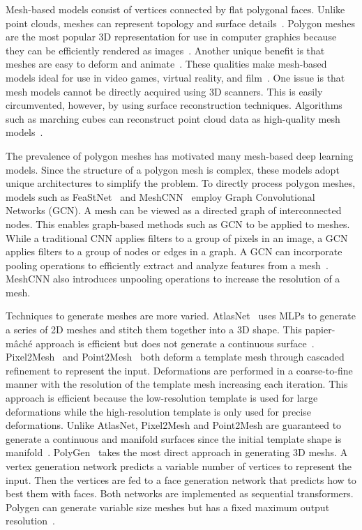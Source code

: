 Mesh-based models consist of vertices connected by flat polygonal faces. Unlike point clouds, meshes can represent topology and surface details~\cite{Xiao2020}. Polygon meshes are the most popular 3D representation for use in computer graphics because they can be efficiently rendered as images~\cite{Watt1996}. Another unique benefit is that meshes are easy to deform and animate~\cite{Wang2018}. These qualities make mesh-based models ideal for use in video games, virtual reality, and film~\cite{Nash2020}. One issue is that mesh models cannot be directly acquired using 3D scanners. This is easily circumvented, however, by using surface reconstruction techniques. Algorithms such as marching cubes can reconstruct point cloud data as high-quality mesh models~\cite{Yuan2022}.

The prevalence of polygon meshes has motivated many mesh-based deep learning models. Since the structure of a polygon mesh is complex, these models adopt unique architectures to simplify the problem. To directly process polygon meshes, models such as FeaStNet~\cite{Verma2018} and MeshCNN~\cite{Hanocka2019} employ Graph Convolutional Networks (GCN). A mesh can be viewed as a directed graph of interconnected nodes. This enables graph-based methods such as GCN to be applied to meshes. While a traditional CNN applies filters to a group of pixels in an image, a GCN applies filters to a group of nodes or edges in a graph. A GCN can incorporate pooling operations to efficiently extract and analyze features from a mesh~\cite{Verma2018}. MeshCNN also introduces unpooling operations to increase the resolution of a mesh.

Techniques to generate meshes are more varied. AtlasNet~\cite{Groueix2018} uses MLPs to generate a series of 2D meshes and stitch them together into a 3D shape. This papier-m\^{a}ch\'{e} approach is efficient but does not generate a continuous surface~\cite{Groueix2018}. Pixel2Mesh~\cite{Wang2018} and Point2Mesh~\cite{Hanocka2020} both deform a template mesh through cascaded refinement to represent the input. Deformations are performed in a coarse-to-fine manner with the resolution of the template mesh increasing each iteration. This approach is efficient because the low-resolution template is used for large deformations while the high-resolution template is only used for precise deformations. Unlike AtlasNet, Pixel2Mesh and Point2Mesh are guaranteed to generate a continuous and manifold surfaces since the initial template shape is manifold~\cite{Wang2018, Hanocka2020}. PolyGen~\cite{Nash2020} takes the most direct approach in generating 3D meshs. A vertex generation network predicts a variable number of vertices to represent the input. Then the vertices are fed to a face generation network that predicts how to best them with faces. Both networks are implemented as sequential transformers. Polygen can generate variable size meshes but has a fixed maximum output resolution~\cite{Nash2020}.



